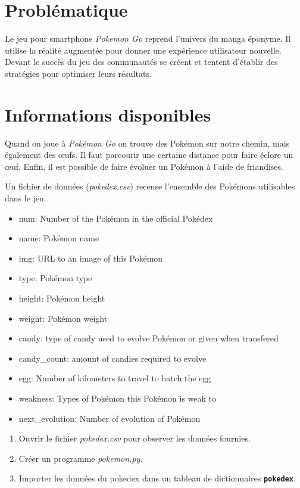 \documentclass[a4paper,11pt]{article}
\begin{document}
\section{Problématique}
Le jeu pour smartphone \emph{Pokemon Go} reprend l'univers du manga éponyme. Il utilise la réalité augmentée pour donner une expérience utilisateur nouvelle. Devant le succès du jeu des communautés se créent et tentent d'établir des stratégies pour optimiser leurs résultats.

\begin{center}
\end{center}
\section{Informations disponibles}
Quand on joue à \emph{Pokémon Go} on trouve des Pokémon sur notre chemin, mais également des œufs. Il faut parcourir une certaine distance pour faire éclore un œuf. Enfin, il est possible de faire évoluer un Pokémon à l'aide de friandises.

Un fichier de données (\emph{pokedex.csv}) recense l'ensemble des Pokémons utilisables dans le jeu. 
\begin{itemize}
    \item num: Number of the Pokémon in the official Pokédex
    \item name: Pokémon name
    \item img: URL to an image of this Pokémon
    \item type: Pokémon type
    \item height: Pokémon height
    \item weight: Pokémon weight
    \item candy: type of candy used to evolve Pokémon or given when transfered
    \item candy\_count: amount of candies required to evolve
    \item egg: Number of kilometers to travel to hatch the egg
    \item weakness: Types of Pokémon this Pokémon is weak to
    \item next\_evolution: Number of evolution of Pokémon
\end{itemize}
\begin{activite}
\begin{enumerate}
    \item Ouvrir le fichier \emph{pokedex.csv} pour observer les données fournies.
    \item Créer un programme \emph{pokemon.py}.
    \item Importer les données du pokedex dans un tableau de dictionnaires \textbf{\texttt{pokedex}}.
\end{enumerate}
\end{activite}
\end{document}
